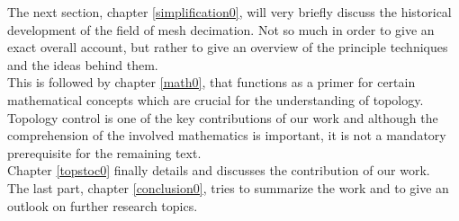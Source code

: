 The next section, chapter \ref{simplification0}, will very briefly discuss the historical development of the field of mesh decimation.
Not so much in order to give an exact overall account, but rather to give an overview of the principle techniques and the ideas behind them.\\ 
This is followed by chapter \ref{math0}, that functions as a primer for certain mathematical concepts which are crucial for the understanding of topology.
Topology control is one of the key contributions of our work and although the comprehension of the involved mathematics is important, it is not a mandatory prerequisite for the remaining text.\\
Chapter \ref{topstoc0} finally details and discusses the contribution of our work.\\
The last part, chapter \ref{conclusion0}, tries to summarize the work and to give an outlook on further research topics.

